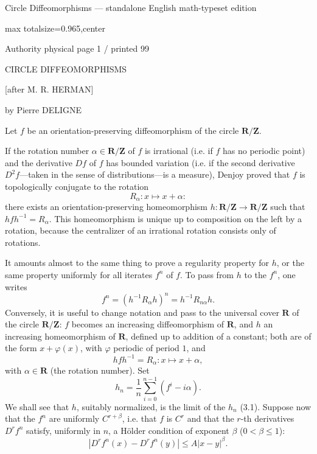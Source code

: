 \documentclass{article}
\begin{document}
\fontsize{8.35}{9.55}\selectfont
\begin{center}\scriptsize Circle Diffeomorphisms --- standalone English math-typeset edition\end{center}

\noindent\begin{adjustbox}{max totalsize={\textwidth}{0.965\textheight},center}\begin{minipage}{\textwidth}
\noindent\hfill\scriptsize Authority physical page 1 / printed 99\par\normalsize
CIRCLE DIFFEOMORPHISMS

[after M. R. HERMAN]

by Pierre DELIGNE

Let \(f\) be an orientation-preserving diffeomorphism of the circle \(\mathbf R/\mathbf Z\).

If the rotation number \(\alpha\in\mathbf R/\mathbf Z\) of \(f\) is irrational (i.e. if \(f\) has no periodic point) and the derivative \(Df\) of \(f\) has bounded variation (i.e. if the second derivative \(D^2f\)—taken in the sense of distributions—is a measure), Denjoy proved that \(f\) is topologically conjugate to the rotation
\[
R_\alpha:x\longmapsto x+\alpha:
\]
there exists an orientation-preserving homeomorphism \(h:\mathbf R/\mathbf Z\to\mathbf R/\mathbf Z\) such that \(hfh^{-1}=R_\alpha\). This homeomorphism is unique up to composition on the left by a rotation, because the centralizer of an irrational rotation consists only of rotations.

It amounts almost to the same thing to prove a regularity property for \(h\), or the same property uniformly for all iterates \(f^n\) of \(f\). To pass from \(h\) to the \(f^n\), one writes
\[
f^n=(h^{-1}R_\alpha h)^n=h^{-1}R_{n\alpha}h.
\]
Conversely, it is useful to change notation and pass to the universal cover \(\mathbf R\) of the circle \(\mathbf R/\mathbf Z\): \(f\) becomes an increasing diffeomorphism of \(\mathbf R\), and \(h\) an increasing homeomorphism of \(\mathbf R\), defined up to addition of a constant; both are of the form \(x+\varphi(x)\), with \(\varphi\) periodic of period \(1\), and
\[
hfh^{-1}=R_\alpha:x\longmapsto x+\alpha,
\]
with \(\alpha\in\mathbf R\) (the rotation number). Set
\[
h_n=\frac1n\sum_{i=0}^{n-1}(f^i-i\alpha).
\]
We shall see that \(h\), suitably normalized, is the limit of the \(h_n\) (3.1). Suppose now that the \(f^n\) are uniformly \(C^{r+\beta}\), i.e. that \(f\) is \(C^r\) and that the \(r\)-th derivatives \(D^rf^n\) satisfy, uniformly in \(n\), a Hölder condition of exponent \(\beta\) (\(0<\beta\leq1\)):
\[
|D^rf^n(x)-D^rf^n(y)|\leq A|x-y|^\beta.
\]
\end{minipage}\end{adjustbox}
\end{document}
